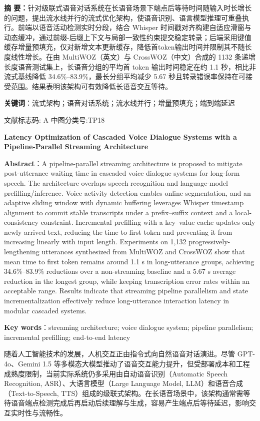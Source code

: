 \documentclass[
]{article}
\subtitle{\textbf{流水线并行流式架构的级联式语音对话系统延迟优化}}
\author{}
\date{}
\begin{document}
\textbf{摘 要：}针对级联式语音对话系统在长语音场景下端点后等待时间随输入时长增长的问题，提出流水线并行的流式优化架构，使语音识别、语言模型推理可重叠执行。前端以语音活动检测实时分段，结合 Whisper 时间戳对齐构建自适应滑窗与动态缓冲，通过前缀-后缀上下文与局部一致性约束提交稳定转录；后端采用键值缓存增量预填充，仅对新增文本更新缓存，降低首token输出时间并限制其不随长度线性增长。在由 MultiWOZ（英文）与 CrossWOZ（中文）合成的 1132 条递增长度语音测试集上，长语音分组的平均首 token 输出时间稳定在约 1.1 秒，相比非流式基线降低 34.6\%--83.9\%，最长分组平均减少 5.67 秒且转录错误率保持在可接受范围。结果表明该架构可有效降低长语音交互等待。

\textbf{关键词}：流式架构；语音对话系统；流水线并行；增量预填充；端到端延迟

文献标志码: A 中图分类号:TP18

\textbf{Latency Optimization of Cascaded Voice Dialogue Systems with a Pipeline-Parallel Streaming Architecture}

\textbf{Abstract}：A pipeline-parallel streaming architecture is proposed to mitigate post-utterance waiting time in cascaded voice dialogue systems for long-form speech. The architecture overlaps speech recognition and language-model prefilling/inference. Voice activity detection enables online segmentation, and an adaptive sliding window with dynamic buffering leverages Whisper timestamp alignment to commit stable transcripts under a prefix--suffix context and a local-consistency constraint. Incremental prefilling with a key--value cache updates only newly arrived text, reducing the time to first token and preventing it from increasing linearly with input length. Experiments on 1,132 progressively-lengthening utterances synthesized from MultiWOZ and CrossWOZ show that mean time to first token remains around 1.1 s in long-utterance groups, achieving 34.6\%--83.9\% reductions over a non-streaming baseline and a 5.67 s average reduction in the longest group, while keeping transcription error rates within an acceptable range. Results indicate that streaming pipeline parallelism and state incrementalization effectively reduce long-utterance interaction latency in modular cascaded systems.

\textbf{Key words}：streaming architecture; voice dialogue system; pipeline parallelism; incremental prefilling; end-to-end latency

随着人工智能技术的发展，人机交互正由指令式向自然语音对话演进。尽管 GPT-4o、Gemini 1.5 等多模态大模型推动了语音交互能力提升，但受部署成本和工程成熟度限制，当前实际系统仍多采用由自动语音识别（Automatic Speech Recognition, ASR）、大语言模型（Large Language Model, LLM）和语音合成（Text-to-Speech, TTS）组成的级联式架构。在长语音场景中，该架构通常需等待语音端点检测完成后再启动后续理解与生成，容易产生端点后等待延迟，影响交互实时性与流畅性。
\end{document}
